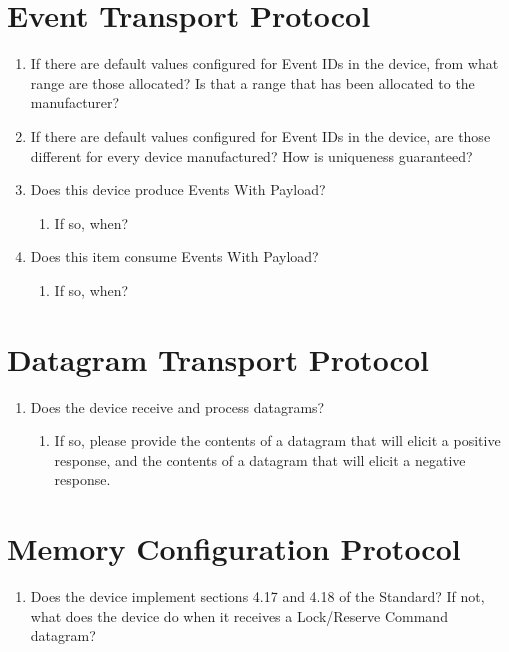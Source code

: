 \section{Event Transport Protocol}
    \begin{enumerate}
        \item If there are default values configured for Event IDs in the device,
            from what range are those allocated? Is that a range that has been
            allocated to the manufacturer?
        \item  If there are default values configured for Event IDs in the device,
            are those different for every device manufactured? How is uniqueness
            guaranteed?
        \item Does this device produce Events With Payload?  
            \begin{enumerate}
                \item If so, when?
            \end{enumerate}
        \item Does this item consume Events With Payload?
            \begin{enumerate}
                \item If so, when?
            \end{enumerate}
    \end{enumerate}

\section{Datagram Transport Protocol}
    \begin{enumerate}
        \item Does the device receive and process datagrams?
            \begin{enumerate}
                \item If so, please provide the contents of a datagram that
                    will elicit a positive response, and the contents of a 
                    datagram that will elicit a negative response.
            \end{enumerate}
    \end{enumerate}

\section{Memory Configuration Protocol}
    \begin{enumerate}
        \item Does the device implement sections 4.17 and 4.18 of the Standard?
              If not, what does the device do when it receives a Lock/Reserve Command 
              datagram?
    \end{enumerate}

